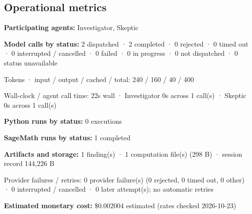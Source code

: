 \documentclass[11pt]{article}
\begin{document}
\subsection{Operational metrics}
\textbf{Participating agents:} Investigator, Skeptic\par
\textbf{Model calls by status:} 2 dispatched · 2 completed · 0 rejected · 0 timed out · 0 interrupted / cancelled · 0 failed · 0 in progress · 0 not dispatched · 0 status unavailable\par
Tokens · input / output / cached / total: 240 / 160 / 40 / 400\par
Wall-clock / agent call time: 22s wall · Investigator 0s across 1 call(s) · Skeptic 0s across 1 call(s)\par
\textbf{Python runs by status:} 0 executions\par
\textbf{SageMath runs by status:} 1 completed\par
\textbf{Artifacts and storage:} 1 finding(s) · 1 computation file(s) (298 B) · session record 144,226 B\par
Provider failures / retries: 0 provider failure(s) (0 rejected, 0 timed out, 0 other) · 0 interrupted / cancelled · 0 later attempt(s); no automatic retries\par
\textbf{Estimated monetary cost:} \$0.002004 estimated (rates checked 2026-10-23)\par
\end{document}
